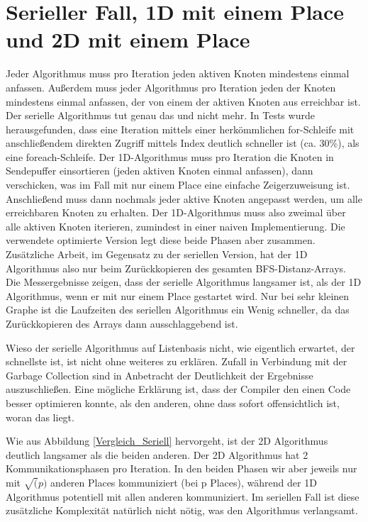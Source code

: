 \section{Serieller Fall, 1D mit einem Place und 2D mit einem Place} %
\label{sec:serieller_fall_vs_1d_mit_einem_place}
Jeder Algorithmus muss pro Iteration jeden aktiven Knoten mindestens einmal anfassen. Außerdem muss jeder Algorithmus pro Iteration jeden der Knoten mindestens einmal anfassen, der von einem der aktiven Knoten aus erreichbar ist. Der serielle Algorithmus tut genau das und nicht mehr. In Tests wurde herausgefunden, dass eine Iteration mittels einer herkömmlichen for-Schleife mit anschließendem direkten Zugriff mittels Index deutlich schneller ist (ca. 30\%), als eine foreach-Schleife. Der 1D-Algorithmus muss pro Iteration die Knoten in Sendepuffer einsortieren (jeden aktiven Knoten einmal anfassen), dann verschicken, was im Fall mit nur einem Place eine einfache Zeigerzuweisung ist. Anschließend muss dann nochmals jeder aktive Knoten angepasst werden, um alle erreichbaren Knoten zu erhalten. Der 1D-Algorithmus muss also zweimal über alle aktiven Knoten iterieren, zumindest in einer naiven Implementierung. Die verwendete optimierte Version legt diese beide Phasen aber zusammen. Zusätzliche Arbeit, im Gegensatz zu der seriellen Version, hat der 1D Algorithmus also nur beim Zurückkopieren des gesamten BFS-Distanz-Arrays. Die Messergebnisse zeigen, dass der serielle Algorithmus langsamer ist, als der 1D Algorithmus, wenn er mit nur einem Place gestartet wird. Nur bei sehr kleinen Graphe ist die Laufzeiten des seriellen Algorithmus ein Wenig schneller, da das Zurückkopieren des Arrays dann ausschlaggebend ist.

Wieso der serielle Algorithmus auf Listenbasis nicht, wie eigentlich erwartet, der schnellste ist, ist nicht ohne weiteres zu erklären. Zufall in Verbindung mit der Garbage Collection sind in Anbetracht der Deutlichkeit der Ergebnisse auszuschließen. Eine mögliche Erklärung ist, dass der Compiler den einen Code besser optimieren konnte, als den anderen, ohne dass sofort offensichtlich ist, woran das liegt.

Wie aus Abbildung \ref{Vergleich_Seriell} hervorgeht, ist der 2D Algorithmus deutlich langsamer als die beiden anderen. Der 2D Algorithmus hat 2 Kommunikationsphasen pro Iteration. In den beiden Phasen wir aber jeweils nur mit $\sqrt(p)$ anderen Places kommuniziert (bei p Places)\cite{Buluc:2011}, während der 1D Algorithmus potentiell mit allen anderen kommuniziert. Im seriellen Fall ist diese zusätzliche Komplexität natürlich nicht nötig, was den Algorithmus verlangsamt.

